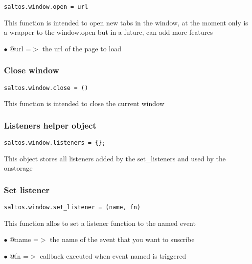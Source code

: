 \documentclass[a4paper]{article}
\begin{document}
\begin{lstlisting}
saltos.window.open = url
\end{lstlisting}

This function is intended to open new tabs in the window, at the moment only is a wrapper to
the window.open but in a future, can add more features

\begin{compactitem}
\item[\color{myblue}$\bullet$] @url =$>$ the url of the page to load
\end{compactitem}

\hypertarget{toc864}{}
\subsubsection{Close window}

\begin{lstlisting}
saltos.window.close = ()
\end{lstlisting}

This function is intended to close the current window

\hypertarget{toc865}{}
\subsubsection{Listeners helper object}

\begin{lstlisting}
saltos.window.listeners = {};
\end{lstlisting}

This object stores all listeners added by the set\_listeners and used by the onstorage

\hypertarget{toc866}{}
\subsubsection{Set listener}

\begin{lstlisting}
saltos.window.set_listener = (name, fn)
\end{lstlisting}

This function allos to set a listener function to the named event

\begin{compactitem}
\item[\color{myblue}$\bullet$] @name =$>$ the name of the event that you want to suscribe
\item[\color{myblue}$\bullet$] @fn   =$>$ callback executed when event named is triggered
\end{compactitem}
\end{document}
